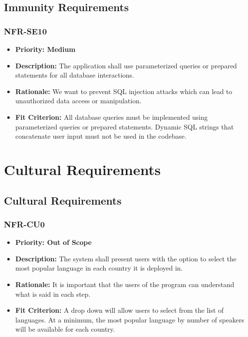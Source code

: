 \documentclass[12pt]{article}
\begin{document}
\subsection{Immunity Requirements}
\subsubsection*{NFR-SE10}
\label{sec:SE10}
\begin{itemize}
  \item \textbf{Priority: Medium}
  \item \textbf{Description:} The application shall use parameterized queries or prepared statements for all database interactions.
  \item \textbf{Rationale:} We want to prevent SQL injection attacks which can lead to unauthorized data access or manipulation.
  \item \textbf{Fit Criterion:} All database queries must be implemented using parameterized queries or prepared statements. Dynamic SQL strings that concatenate user input must not be used in the codebase.
\end{itemize}

\section{Cultural Requirements}
\subsection{Cultural Requirements}
\subsubsection*{NFR-CU0}
\label{sec:CU0}
\begin{itemize}
  \item \textbf{Priority: Out of Scope}
  \item \textbf{Description:} The system shall present users with the option to select the most popular language in each country it is deployed in.
  \item \textbf{Rationale:} It is important that the users of the program can understand what is said in each step.
  \item \textbf{Fit Criterion:} A drop down will allow users to select from the list of languages. At a minimum, the most popular language by number of speakers will be available for each country.
\end{itemize}
\end{document}
